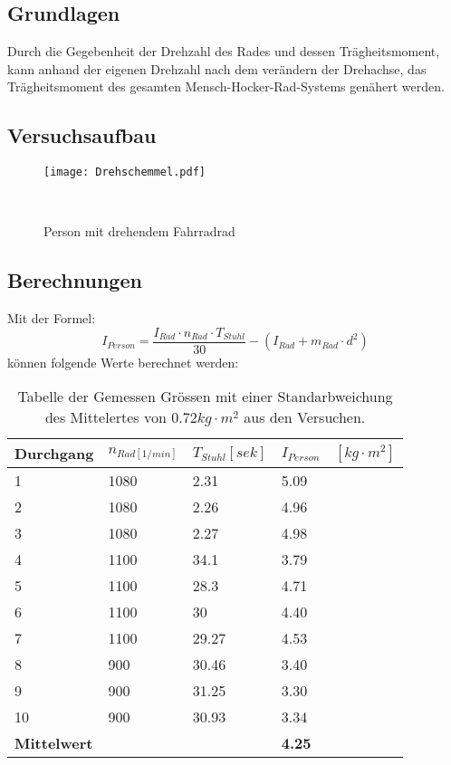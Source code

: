 \documentclass{article}
\begin{document}
\subsection{Grundlagen}
Durch die Gegebenheit der Drehzahl des Rades und dessen Trägheitsmoment, kann anhand der eigenen
Drehzahl nach dem verändern der Drehachse, das Trägheitsmoment des gesamten 
Mensch-Hocker-Rad-Systems genähert werden.

\subsection{Versuchsaufbau}
\begin{figure}[h]
\center

\texttt{[image: Drehschemmel.pdf]} 
\caption{Person mit drehendem Fahrradrad}
\

\end{figure}

\subsection{Berechnungen}
Mit der Formel:
\begin{equation}
I_{Person}=\frac{I_{Rad}\cdot n_{Rad}\cdot T_{Stuhl}}{30}-(I_{Rad}+m_{Rad}\cdot d^2)
\end{equation}
können folgende Werte berechnet werden:
\begin{table}[H]
   \center
    \begin{tabular}{|l|l|l|l|}
        \hline
     
        Durchgang & $n_{Rad[1/min]}$ & $T_{Stuhl}[sek]$ & $I_{Person}\quad [kg\cdot m^2]$ \\ \hline
        1         & 1080         & 2.31    & 5.09      \\ 
        2         & 1080         & 2.26    & 4.96       \\ 
        3         & 1080         & 2.27    & 4.98        \\ 
        4         & 1100         & 34.1    & 3.79        \\ 
        5         & 1100         & 28.3    & 4.71        \\ 
        6         & 1100         & 30      & 4.40        \\ 
        7         & 1100         & 29.27   & 4.53        \\ 
        8         & 900          & 30.46   & 3.40        \\ 
        9         & 900          & 31.25   & 3.30        \\ 
        10        & 900          & 30.93   & 3.34        \\ \hline
        	\textbf{Mittelwert}&&&\textbf{4.25}\\
        \hline
    \end{tabular}
    \caption{Tabelle der Gemessen Grössen mit einer Standarbweichung des Mittelertes von 0.72$ kg\cdot m^2$ aus den Versuchen.}
\end{table}
\end{document}

